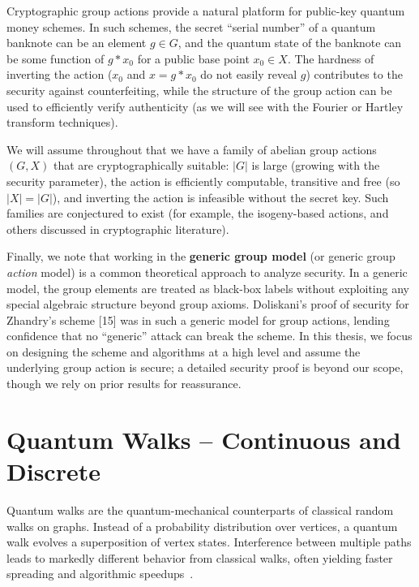 \documentclass[12pt]{report}
\begin{document}
Cryptographic group actions provide a natural platform for public-key quantum money schemes. In such schemes, the secret “serial number” of a quantum banknote can be an element $g \in G$, and the quantum state of the banknote can be some function of $g*x_0$ for a public base point $x_0 \in X$. The hardness of inverting the action ($x_0$ and $x = g*x_0$ do not easily reveal $g$) contributes to the security against counterfeiting, while the structure of the group action can be used to efficiently verify authenticity (as we will see with the Fourier or Hartley transform techniques).

We will assume throughout that we have a family of abelian group actions $(G,X)$ that are cryptographically suitable: $|G|$ is large (growing with the security parameter), the action is efficiently computable, transitive and free (so $|X|=|G|$), and inverting the action is infeasible without the secret key. Such families are conjectured to exist (for example, the isogeny-based actions, and others discussed in cryptographic literature). 

Finally, we note that working in the \textbf{generic group model} (or generic group \emph{action} model) is a common theoretical approach to analyze security. In a generic model, the group elements are treated as black-box labels without exploiting any special algebraic structure beyond group axioms. Doliskani’s proof of security for Zhandry’s scheme [15] was in such a generic model for group actions, lending confidence that no “generic” attack can break the scheme. In this thesis, we focus on designing the scheme and algorithms at a high level and assume the underlying group action is secure; a detailed security proof is beyond our scope, though we rely on prior results for reassurance.





\chapter{Quantum Walks -- Continuous and Discrete}

Quantum walks are the quantum-mechanical counterparts of classical random walks on graphs. Instead of a probability distribution over vertices, a quantum walk evolves a superposition of vertex states. Interference between multiple paths leads to markedly different behavior from classical walks, often yielding faster spreading and algorithmic speedups~\cite{physics_stackexchange}.
\end{document}

